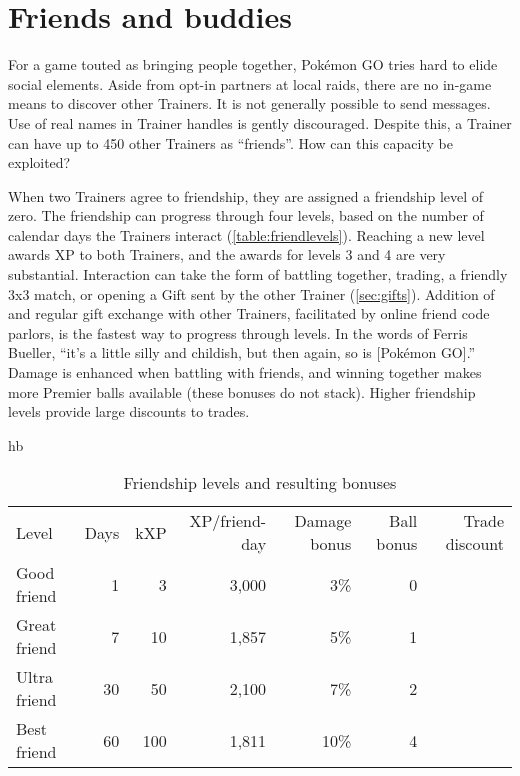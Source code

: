 \chapter{Friends and buddies}
\label{chap:friends}
For a game touted as bringing people together, Pokémon GO tries hard to elide social elements.
Aside from opt-in partners at local raids, there are no in-game means to discover other Trainers.
It is not generally possible to send messages.
Use of real names in Trainer handles is gently discouraged.
Despite this, a Trainer can have up to 450 other Trainers as ``friends''.
How can this capacity be exploited?

When two Trainers agree to friendship, they are assigned a friendship level of zero.
The friendship can progress through four levels, based on the number of calendar
  days the Trainers interact (\autoref{table:friendlevels}).
Reaching a new level awards XP to both Trainers, and the awards for levels 3 and 4 are very substantial.
Interaction can take the form of battling together, trading, a friendly 3x3 match, or
  opening a Gift sent by the other Trainer (\autoref{sec:gifts}).
Addition of and regular gift exchange with other Trainers, facilitated by online friend code parlors,
  is the fastest way to progress through levels.
In the words of Ferris Bueller, ``it's a little silly and childish, but then again, so is [Pokémon GO].''
Damage is enhanced when battling with friends, and winning together
  makes more Premier balls available (these bonuses do not stack).
Higher friendship levels provide large discounts to trades.
\begin{table}{hb}
\centering
\begin{tabular}{lrrrrrr}
Level & Days & kXP & XP/friend-day & Damage bonus & Ball bonus & Trade discount\\
\Midrule
Good friend  &  1 &   3 & 3,000 &  3\% & 0 & \\
Great friend &  7 &  10 & 1,857 &  5\% & 1 & \\
Ultra friend & 30 &  50 & 2,100 &  7\% & 2 & \\
Best friend  & 60 & 100 & 1,811 & 10\% & 4 & \\
\end{tabular}
\caption{Friendship levels and resulting bonuses}
\label{table:friendlevels}
\end{table}

